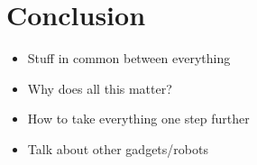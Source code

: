 \newpage
\section{Conclusion}
\begin{itemize}
  \item Stuff in common between everything
  \item Why does all this matter?
  \item How to take everything one step further
  \item Talk about other gadgets/robots
\end{itemize}

\newpage
{}
